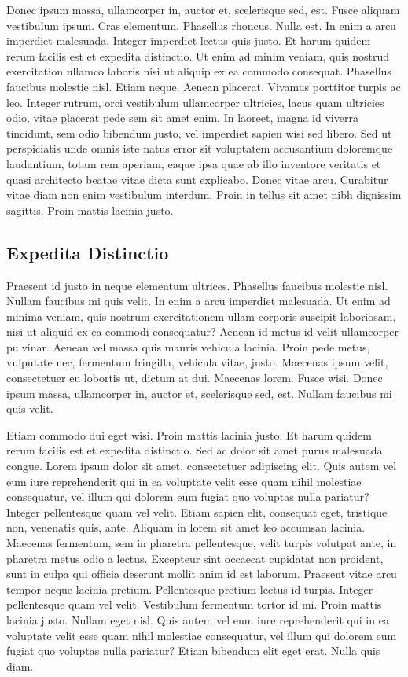 Donec ipsum massa, ullamcorper in, auctor et, scelerisque sed, est. Fusce aliquam vestibulum ipsum. Cras elementum. Phasellus rhoncus. Nulla est. In enim a arcu imperdiet malesuada. Integer imperdiet lectus quis justo. Et harum quidem rerum facilis est et expedita distinctio. Ut enim ad minim veniam, quis nostrud exercitation ullamco laboris nisi ut aliquip ex ea commodo consequat. Phasellus faucibus molestie nisl. Etiam neque. Aenean placerat. Vivamus porttitor turpis ac leo. Integer rutrum, orci vestibulum ullamcorper ultricies, lacus quam ultricies odio, vitae placerat pede sem sit amet enim. In laoreet, magna id viverra tincidunt, sem odio bibendum justo, vel imperdiet sapien wisi sed libero. Sed ut perspiciatis unde omnis iste natus error sit voluptatem accusantium doloremque laudantium, totam rem aperiam, eaque ipsa quae ab illo inventore veritatis et quasi architecto beatae vitae dicta sunt explicabo. Donec vitae arcu. Curabitur vitae diam non enim vestibulum interdum. Proin in tellus sit amet nibh dignissim sagittis. Proin mattis lacinia justo.

\subsection{Expedita Distinctio}
\label{sec:ExpeditaDistinctio}
Praesent id justo in neque elementum ultrices. Phasellus faucibus molestie nisl. Nullam faucibus mi quis velit. In enim a arcu imperdiet malesuada. Ut enim ad minima veniam, quis nostrum exercitationem ullam corporis suscipit laboriosam, nisi ut aliquid ex ea commodi consequatur? Aenean id metus id velit ullamcorper pulvinar. Aenean vel massa quis mauris vehicula lacinia. Proin pede metus, vulputate nec, fermentum fringilla, vehicula vitae, justo. Maecenas ipsum velit, consectetuer eu lobortis ut, dictum at dui. Maecenas lorem. Fusce wisi. Donec ipsum massa, ullamcorper in, auctor et, scelerisque sed, est. Nullam faucibus mi quis velit.

Etiam commodo dui eget wisi. Proin mattis lacinia justo. Et harum quidem rerum facilis est et expedita distinctio. Sed ac dolor sit amet purus malesuada congue. Lorem ipsum dolor sit amet, consectetuer adipiscing elit. Quis autem vel eum iure reprehenderit qui in ea voluptate velit esse quam nihil molestiae consequatur, vel illum qui dolorem eum fugiat quo voluptas nulla pariatur? Integer pellentesque quam vel velit. Etiam sapien elit, consequat eget, tristique non, venenatis quis, ante. Aliquam in lorem sit amet leo accumsan lacinia. Maecenas fermentum, sem in pharetra pellentesque, velit turpis volutpat ante, in pharetra metus odio a lectus. Excepteur sint occaecat cupidatat non proident, sunt in culpa qui officia deserunt mollit anim id est laborum. Praesent vitae arcu tempor neque lacinia pretium. Pellentesque pretium lectus id turpis. Integer pellentesque quam vel velit. Vestibulum fermentum tortor id mi. Proin mattis lacinia justo. Nullam eget nisl. Quis autem vel eum iure reprehenderit qui in ea voluptate velit esse quam nihil molestiae consequatur, vel illum qui dolorem eum fugiat quo voluptas nulla pariatur? Etiam bibendum elit eget erat. Nulla quis diam.

